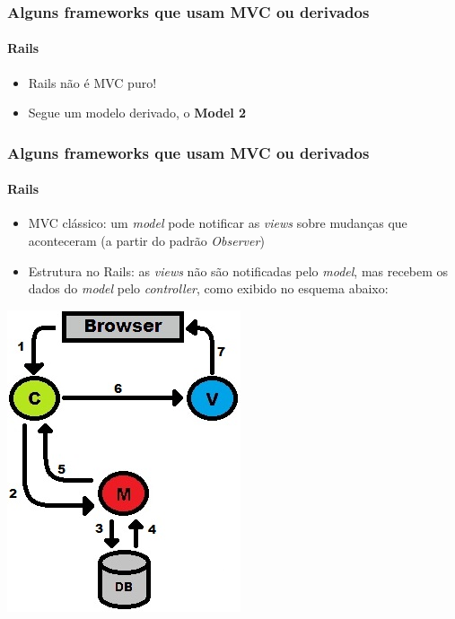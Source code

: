 \documentclass{beamer}
\begin{document}
\begin{frame}
\frametitle{Alguns frameworks que usam MVC ou derivados}
\framesubtitle{Rails}
\begin{itemize}
  \item {Rails não é MVC puro!}
  \item {Segue um modelo derivado, o \textbf{Model 2}}
\end{itemize}
\end{frame}

\begin{frame}
\frametitle{Alguns frameworks que usam MVC ou derivados}
\framesubtitle{Rails}
\begin{itemize}
  \item {MVC clássico: um \textit{model} pode notificar as \textit{views} sobre mudanças que aconteceram (a partir do padrão \textit{Observer})}
  \item {Estrutura no Rails: as \textit{views} não são notificadas pelo \textit{model}, mas recebem os dados do \textit{model} pelo \textit{controller}, como exibido no esquema abaixo:}
\end{itemize}
	\begin{center}
		\includegraphics[scale=0.35]{RailsMVC.jpg}
	\end{center}
\end{frame}
\end{document}
